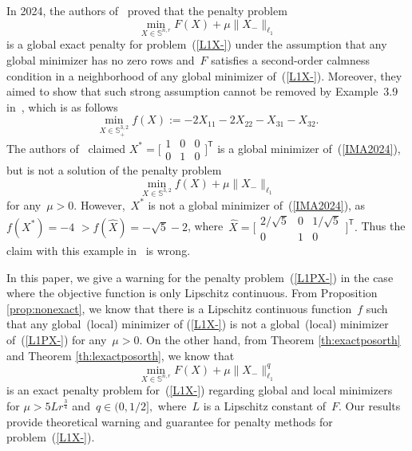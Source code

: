 \documentclass[11pt,a4paper]{article}  %
\theoremstyle{definition}
\newcommand{\col}{r}
\newcommand{\stf}[1]{\mathbb{S}^{#1}}
\newcommand{\trs}{{\scriptstyle{\mathsf{T}}}}
\begin{document}
In 2024, the authors of~\cite{Qian_Pan_Xiao_2023} proved that the penalty problem
\begin{equation}\label{L1PX-}
\min_{X\in  \stf{n,\col}} F(X) +\mu\|X_{-}\|_{\ell_1}
\end{equation}
is a global exact penalty for problem~(\ref{L1X-})
under the assumption that any global minimizer has no zero rows and~$F$ satisfies a second-order
calmness condition in a neighborhood of any global minimizer of~(\ref{L1X-}).  Moreover, they aimed
to show that such strong assumption  cannot be removed by Example~3.9 in~\cite{Qian_Pan_Xiao_2023}, which is as follows
\begin{equation}\label{IMA2024}
\min_{X\in  \stf{3,2}_+} f(X):=-2X_{11}-2X_{22}-X_{31}-X_{32}.
\end{equation}
The authors of~\cite{Qian_Pan_Xiao_2023} claimed
$X^*=\Bigg[\begin{array}{lll}
1 & 0 &0\\
0 & 1 & 0
\end{array}\Bigg]^\trs$ is a global minimizer of~(\ref{IMA2024}), but is not a solution of the penalty problem
$$
\min_{X\in  \stf{3,2}} f(X) + \mu \|X_{-}\|_{\ell_1}
$$
for any~$\mu>0$.
However,~$X^*$ is not a global minimizer of~(\ref{IMA2024}), as~$f(X^*)=-4$
$>f(\hat{X})= -\sqrt{5}-2$, where~$\hat{X}=\Bigg[\begin{array}{lll}
2/\sqrt{5} & 0 &1/\sqrt{5}\\
0 & 1 & 0
\end{array}\Bigg]^\trs.$  Thus the claim with this example in~\cite{Qian_Pan_Xiao_2023} is wrong.

In this paper, we give a warning for the penalty problem~(\ref{L1PX-}) in the case where the objective function is only Lipschitz continuous.  From Proposition \ref{prop:nonexact}, we know that
there is a Lipschitz continuous function~$f$ such that any global~(local) minimizer  of
(\ref{L1X-}) is not a global~(local)  minimizer of~(\ref{L1PX-}) for any~$\mu>0$.
On the other hand, from Theorem \ref{th:exactposorth} and Theorem \ref{th:lexactposorth}, we know that
\begin{equation}
    \nonumber
\min_{X\in  \stf{n,\col}} F(X) +\mu\|X_{-}\|^q_{\ell_1}
\end{equation}
is an exact penalty problem for~(\ref{L1X-}) regarding global and local minimizers for
$\mu > 5 L\col^\frac{3}{4}$ and~$q\in (0, 1/2],$ where~$L$ is a  Lipschitz constant of~$F$. Our results
provide theoretical warning and guarantee for penalty methods for problem~(\ref{L1X-}).
\end{document}
